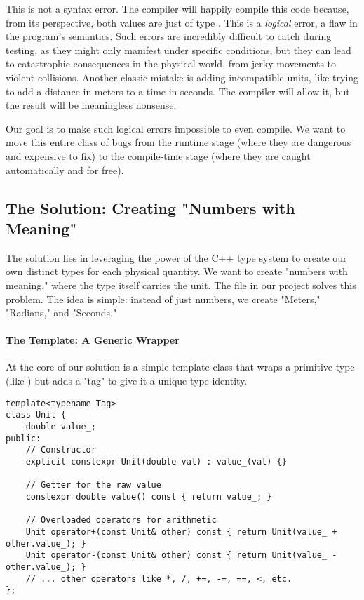 This is not a syntax error. The compiler will happily compile this code because, from its perspective, both values are just of type . This is a \textit{logical} error, a flaw in the program's semantics. Such errors are incredibly difficult to catch during testing, as they might only manifest under specific conditions, but they can lead to catastrophic consequences in the physical world, from jerky movements to violent collisions. Another classic mistake is adding incompatible units, like trying to add a distance in meters to a time in seconds. The compiler will allow it, but the result will be meaningless nonsense.

Our goal is to make such logical errors impossible to even compile. We want to move this entire class of bugs from the runtime stage (where they are dangerous and expensive to fix) to the compile-time stage (where they are caught automatically and for free).

\subsection{The Solution: Creating "Numbers with Meaning"}
\label{subsec:numbers_with_meaning}

The solution lies in leveraging the power of the C++ type system to create our own distinct types for each physical quantity. We want to create "numbers with meaning," where the type itself carries the unit. The file  in our project solves this problem. The idea is simple: instead of just numbers, we create "Meters," "Radians," and "Seconds."

\paragraph{The  Template: A Generic Wrapper}
At the core of our solution is a simple template class that wraps a primitive type (like ) but adds a "tag" to give it a unique type identity.

\begin{verbatim}
template<typename Tag>
class Unit {
    double value_;
public:
    // Constructor
    explicit constexpr Unit(double val) : value_(val) {}

    // Getter for the raw value
    constexpr double value() const { return value_; }

    // Overloaded operators for arithmetic
    Unit operator+(const Unit& other) const { return Unit(value_ + other.value_); }
    Unit operator-(const Unit& other) const { return Unit(value_ - other.value_); }
    // ... other operators like *, /, +=, -=, ==, <, etc.
};
\end{verbatim}
\label{lst:unit-template}

